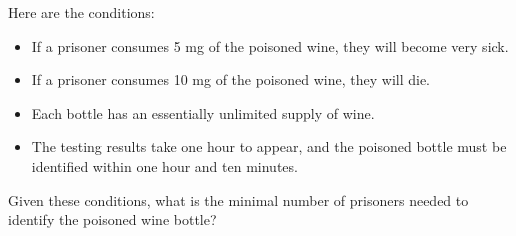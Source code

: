 \documentclass[12pt]{article}
\begin{document}
\begin{enumerate}
    Here are the conditions:
    \begin{itemize}
        \item If a prisoner consumes 5 mg of the poisoned wine, they will become very sick.
        \item If a prisoner consumes 10 mg of the poisoned wine, they will die.
        \item Each bottle has an essentially unlimited supply of wine.
        \item The testing results take one hour to appear, and the poisoned bottle must be identified within one hour and ten minutes.
    \end{itemize}
    Given these conditions, what is the minimal number of prisoners needed to identify the poisoned wine bottle?
\end{enumerate}
\end{document}
